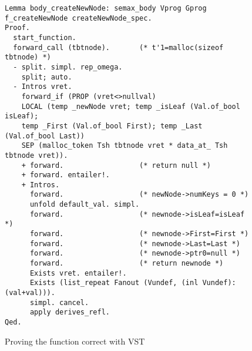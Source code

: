\begin{figure}
  \begin{lstlisting}[language=Coq]
Lemma body_createNewNode: semax_body Vprog Gprog f_createNewNode createNewNode_spec.
Proof.
  start_function.
  forward_call (tbtnode).       (* t'1=malloc(sizeof tbtnode) *)
  - split. simpl. rep_omega.
    split; auto.
  - Intros vret.
    forward_if (PROP (vret<>nullval)
    LOCAL (temp _newNode vret; temp _isLeaf (Val.of_bool isLeaf);
    temp _First (Val.of_bool First); temp _Last (Val.of_bool Last))
    SEP (malloc_token Tsh tbtnode vret * data_at_ Tsh tbtnode vret)).
    + forward.                  (* return null *)
    + forward. entailer!.
    + Intros. 
      forward.                  (* newNode->numKeys = 0 *)
      unfold default_val. simpl.
      forward.                  (* newnode->isLeaf=isLeaf *)
      forward.                  (* newnode->First=First *)
      forward.                  (* newnode->Last=Last *)
      forward.                  (* newnode->ptr0=null *)
      forward.                  (* return newnode *)
      Exists vret. entailer!.
      Exists (list_repeat Fanout (Vundef, (inl Vundef):(val+val))).
      simpl. cancel.
      apply derives_refl.
Qed.
  \end{lstlisting}
  \caption{Proving the function correct with VST}
\end{figure}

    

    
    
